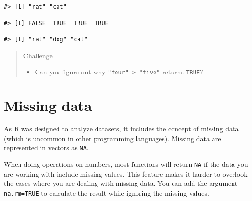 \documentclass[]{book}
\newenvironment{Shaded}{\begin{snugshade}}{\end{snugshade}}
\newcommand{\KeywordTok}[1]{\textcolor[rgb]{0.13,0.29,0.53}{\textbf{{#1}}}}
\newcommand{\StringTok}[1]{\textcolor[rgb]{0.31,0.60,0.02}{{#1}}}
\newcommand{\NormalTok}[1]{{#1}}
\providecommand{\tightlist}{%
  \setlength{\itemsep}{0pt}\setlength{\parskip}{0pt}}
\theoremstyle{definition}
\theoremstyle{definition}
\theoremstyle{remark}
\begin{document}
\begin{verbatim}
#> [1] "rat" "cat"
\end{verbatim}

\begin{Shaded}
\end{Shaded}

\begin{verbatim}
#> [1] FALSE  TRUE  TRUE  TRUE
\end{verbatim}

\begin{Shaded}
\end{Shaded}

\begin{verbatim}
#> [1] "rat" "dog" "cat"
\end{verbatim}

\begin{quote}
Challenge

\begin{itemize}
\tightlist
\item
  Can you figure out why \texttt{"four"\ \textgreater{}\ "five"} returns
  \texttt{TRUE}?
\end{itemize}
\end{quote}

\section{Missing data}\label{missing-data}

As R was designed to analyze datasets, it includes the concept of
missing data (which is uncommon in other programming languages). Missing
data are represented in vectors as \texttt{NA}.

When doing operations on numbers, most functions will return \texttt{NA}
if the data you are working with include missing values. This feature
makes it harder to overlook the cases where you are dealing with missing
data. You can add the argument \texttt{na.rm=TRUE} to calculate the
result while ignoring the missing values.
\end{document}
